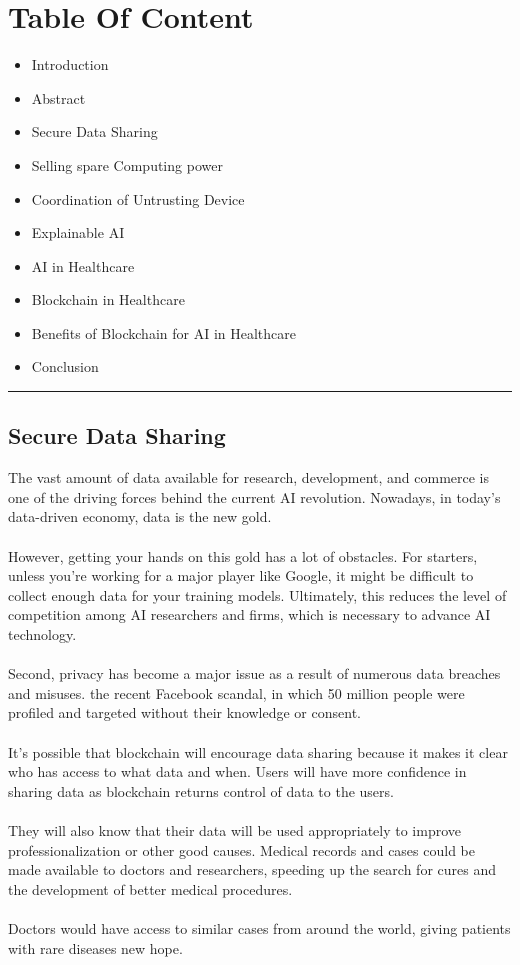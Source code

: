 \documentclass[12pt,letterpaper]{article}
\begin{document}
  \section* {Table Of Content}
    \begin{itemize}
      \item Introduction
      \item Abstract
      \item Secure Data Sharing
      \item Selling spare Computing power
      \item Coordination of Untrusting Device
      \item Explainable AI
      \item AI in Healthcare 
      \item Blockchain in Healthcare
      \item Benefits of Blockchain for AI in Healthcare
      \item Conclusion
    \end{itemize}

    \hrule

\pagebreak

    \subsection* {Secure Data Sharing}
    The vast amount of data available for research, development, and commerce is one of the driving forces behind the current AI revolution. Nowadays, in today's data-driven economy, data is the new gold.
    \\
    \\
    However, getting your hands on this gold has a lot of obstacles. For starters, unless you're working for a major player like Google, it might be difficult to collect enough data for your training models. Ultimately, this reduces the level of competition among AI researchers and firms, which is necessary to advance AI technology. 
    \\
    \\
    Second, privacy has become a major issue as a result of numerous data breaches and misuses. the recent Facebook scandal, in which 50 million people were profiled and targeted without their knowledge or consent.
    \\
    \\
    It's possible that blockchain will encourage data sharing because it makes it clear who has access to what data and when. Users will have more confidence in sharing data as blockchain returns control of data to the users. 
    \\
    \\
    They will also know that their data will be used appropriately to improve professionalization or other good causes. Medical records and cases could be made available to doctors and researchers, speeding up the search for cures and the development of better medical procedures.
    \\
    \\
    Doctors would have access to similar cases from around the world, giving patients with rare diseases new hope.
\end{document}
